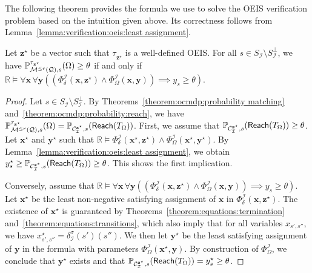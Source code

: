 \documentclass[a4paper,UKenglish,cleveref,autoref,thm-restate,colorlinks]{lipics-v2021}
\newcommand{\IR}{\mathbb{R}}
\newcommand{\mdp}{\mathcal{M}}
\newcommand{\mdpStateSpace}{S}
\newcommand{\mdpTrans}{\delta}
\newcommand{\ocmdp}{\mathcal{Q}}
\newcommand{\ocmdpFin}[2]{\mdp^{\leq #2}(#1)}
\newcommand{\ocConfig}{s}
\newcommand{\ocTrans}{\delta}
\newcommand{\counterUB}{r}
\newcommand{\mchain}{\mathcal{C}}
\newcommand{\intPart}{\mathcal{I}}
\newcommand{\compressChainStrat}[1]{\mchain^{#1}_{\intPart}}
\newcommand{\compressChainStateSpace}{\mdpStateSpace_{\intPart}}
\newcommand{\compressChainStateSpaceStar}{\mdpStateSpace_{\intPart}^{\bot}}
\newcommand{\compressChainTransTemplate}[2]{\mdpTrans^{#1}_{#2}}
\newcommand{\compressChainTrans}{\compressChainTransTemplate{\strat}{\intPart}}
\newcommand{\varTrans}{x}
\newcommand{\varTransTuple}{\mathbf{\varTrans}}
\newcommand{\solTrans}{\varTrans^\star}
\newcommand{\solTransTuple}{\mathbf{\varTrans}^{\star}}
\newcommand{\varObj}{y}
\newcommand{\varObjTuple}{\mathbf{\varObj}}
\newcommand{\solObj}{\varObj^{\star}}
\newcommand{\solObjTuple}{\mathbf{\varObj}^{\star}}
\newcommand{\varStrat}{z}
\newcommand{\solStratTuple}{\mathbf{\varStrat}^{\star}}
\newcommand{\compressChainSymSol}{\compressChainStrat{\solStratTuple}}
\newcommand{\formulaTransBase}{\Phi_{\ocTrans}}
\newcommand{\formulaObjBase}{\Phi_{\objective}}
\newcommand{\formulaTrans}{\formulaTransBase^\intPart}
\newcommand{\formulaObj}{\formulaObjBase^\intPart}
\newcommand{\objective}{\Omega}
\newcommand{\reach}[1]{\mathsf{Reach}(#1)}
\newcommand{\target}{T}
\newcommand{\thresProba}{\theta}
\newcommand{\stratGeneric}[1]{{\sigma_{#1}}}
\newcommand{\strat}{\stratGeneric{}}
\newcommand{\stratBGeneric}[1]{{\tau_{#1}}}
\newcommand{\stratB}{\stratBGeneric{}}
\begin{document}
The following theorem provides the formula we use to solve the OEIS verification problem based on the intuition given above.
Its correctness follows from Lemma~\ref{lemma:verification:oeis:least assignment}.
\begin{theorem}\label{theorem:verification:oeis:formula}
  Let $\solStratTuple$ be a vector such that $\stratB_{\solStratTuple}$ is a well-defined OEIS.
  For all $\ocConfig\in\compressChainStateSpace\setminus\compressChainStateSpaceStar$, we have $\probaGverb{\ocmdpFin{\ocmdp}{\counterUB}}{\ocConfig}{\stratB_{\solStratTuple}}(\objective) \geq\thresProba$ if and only if $\IR\models\forall\varTransTuple\,\forall\varObjTuple ((\formulaTrans(\varTransTuple,\solStratTuple)\land\formulaObj(\varTransTuple, \varObjTuple))\implies \varObj_\ocConfig\geq\thresProba)$.
\end{theorem}
\begin{proof}
  Let $\ocConfig\in\compressChainStateSpace\setminus\compressChainStateSpaceStar$.
  By Theorems~\ref{theorem:ocmdp:probability matching} and~\ref{theorem:ocmdp:probability:reach}, we have $\probaGverb{\ocmdpFin{\ocmdp}{\counterUB}}{\ocConfig}{\stratB_{\solStratTuple}}(\objective)= \probaMCverb{\compressChainSymSol}{\ocConfig}(\reach{\target_\objective})$.
  First, we assume that $\probaMCverb{\compressChainSymSol}{\ocConfig}(\reach{\target_\objective})\geq\thresProba$.
  Let $\solTransTuple$ and $\solObjTuple$ such that $\IR\models\formulaTrans(\solTransTuple,\solStratTuple)\land\formulaObj(\solTransTuple, \solObjTuple)$.
  By Lemma~\ref{lemma:verification:oeis:least assignment}, we obtain $\solObj_\ocConfig\geq \probaMCverb{\compressChainSymSol}{\ocConfig}(\reach{\target_\objective})\geq\thresProba$.
  This shows the first implication.

  Conversely, assume that $\IR\models\forall\varTransTuple\,\forall\varObjTuple ((\formulaTrans(\varTransTuple,\solStratTuple)\land\formulaObj(\varTransTuple, \varObjTuple))\implies \varObj_\ocConfig\geq\thresProba)$.
  Let $\solTransTuple$ be the least non-negative satisfying assignment of $\varTransTuple$ in $\formulaTrans(\varTransTuple,\solStratTuple)$.
  The existence of $\solTransTuple$ is guaranteed by Theorems~\ref{theorem:equations:termination} and~\ref{theorem:equations:transitions}, which also imply that for all variables $\varTrans_{\ocConfig', \ocConfig''}$, we have $\solTrans_{\ocConfig', \ocConfig''} = \compressChainTrans(\ocConfig')(\ocConfig'')$.
  We then let $\solObjTuple$ be the least satisfying assignment of $\varObjTuple$ in the formula with parameters $\formulaObj(\solTransTuple,\varObjTuple)$.
  By construction of $\formulaObj$, we conclude that $\solObjTuple$ exists and that $\probaMCverb{\compressChainSymSol}{\ocConfig}(\reach{\target_\objective})=\solObj_\ocConfig\geq\thresProba$.
\end{proof}
\end{document}
